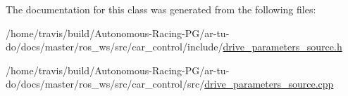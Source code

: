 The documentation for this class was generated from the following files\+:\begin{DoxyCompactItemize}
\item 
/home/travis/build/\+Autonomous-\/\+Racing-\/\+P\+G/ar-\/tu-\/do/docs/master/ros\+\_\+ws/src/car\+\_\+control/include/\hyperlink{drive__parameters__source_8h}{drive\+\_\+parameters\+\_\+source.\+h}\item 
/home/travis/build/\+Autonomous-\/\+Racing-\/\+P\+G/ar-\/tu-\/do/docs/master/ros\+\_\+ws/src/car\+\_\+control/src/\hyperlink{drive__parameters__source_8cpp}{drive\+\_\+parameters\+\_\+source.\+cpp}\end{DoxyCompactItemize}
